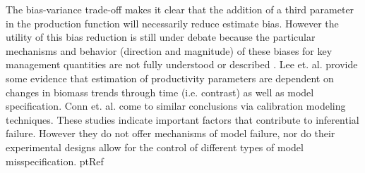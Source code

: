 \documentclass[12pt]{ucscthesis}
\begin{document}
%
The bias-variance trade-off \cite{ramasubramanian_machine_2017} makes it
clear that the addition of a third parameter in the production function will
necessarily reduce estimate bias. However the utility of this bias reduction
is still under debate because the particular mechanisms and behavior (direction and magnitude) %
of these biases for key management quantities %
are not fully understood or described \cite{munyandorero_analytical_2023}. 
Lee et. al. \cite{lee_can_2012} provide some evidence that estimation of productivity parameters %
are dependent on changes in biomass trends through time (i.e. contrast) as well %
as model specification. Conn et. al. \cite{conn_when_2010} come to similar conclusions %
via calibration modeling techniques. These studies indicate important factors that
contribute to inferential failure. However they do not offer mechanisms of model
failure, nor do their experimental designs allow for the control of different
types of model misspecification.
ptRef



\end{document}

